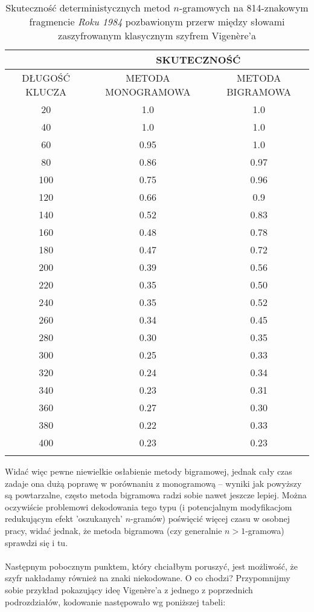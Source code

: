 \documentclass[a4paper]{article}
\theoremstyle{defn}
\theoremstyle{theorem}
\theoremstyle{lemma}
\theoremstyle{cor}
\theoremstyle{fact}
\begin{document}
\begin{center}\begin{longtable}{
|c|c|c|}
\hline &\multicolumn{2}{|c|}{SKUTECZNOŚĆ} \\ 
\hline DŁUGOŚĆ KLUCZA & METODA MONOGRAMOWA & METODA BIGRAMOWA\\ \hline
20
 & 1.0 & 1.0\\ \hline
40
 & 1.0 & 1.0\\ \hline
60
 & 0.95 & 1.0\\ \hline
80
 & 0.86 & 0.97\\ \hline
100
 & 0.75 & 0.96\\ \hline
120
 & 0.66 & 0.9\\ \hline
140
 & 0.52 & 0.83\\ \hline
160
 & 0.48 & 0.78\\ \hline
180
 & 0.47 & 0.72\\ \hline
200
 & 0.39 & 0.56\\ \hline
220
 & 0.35 & 0.50\\ \hline
240
 & 0.35 & 0.52\\ \hline
260
 & 0.34 & 0.45\\ \hline
280
 & 0.30 & 0.35\\ \hline
300
 & 0.25 & 0.33\\ \hline
320
 & 0.24 & 0.34\\ \hline
340
 & 0.23 & 0.31\\ \hline
360
 & 0.27 & 0.30\\ \hline
380
 & 0.22 & 0.33\\ \hline
400
 & 0.23 & 0.23\\ \hline
 \caption{Skuteczność deterministycznych metod $n$-gramowych na 814-znakowym fragmencie \textit{Roku 1984} pozbawionym przerw między słowami zaszyfrowanym klasycznym szyfrem Vigenère'a}
\end{longtable}\end{center}
Widać więc pewne niewielkie osłabienie metody bigramowej, jednak cały czas zadaje ona dużą poprawę w porównaniu z monogramową – wyniki jak powyższy są powtarzalne, często metoda bigramowa radzi sobie nawet jeszcze lepiej. Można oczywiście problemowi dekodowania tego typu (i potencjalnym modyfikacjom redukującym efekt 'oszukanych' $n$-gramów) poświęcić więcej czasu w osobnej pracy, widać jednak, że metoda bigramowa (czy generalnie $n>1$-gramowa) sprawdzi się i tu. \\\\
Następnym pobocznym punktem, który chciałbym poruszyć, jest możliwość, że szyfr nakładamy również na znaki niekodowane. O co chodzi? Przypomnijmy sobie przykład pokazujący ideę Vigenère'a z jednego z poprzednich podrozdziałów, kodowanie następowało wg poniższej tabeli:
\end{document}
